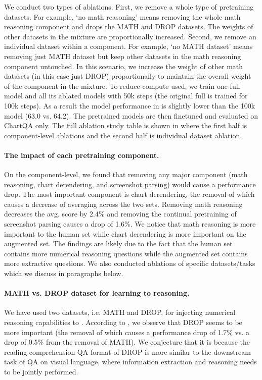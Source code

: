We conduct two types of ablations. First, we remove a whole type of pretraining datasets. For example, `no math reasoning' means removing the whole math reasoning component and drops the MATH and DROP datasets. The weights of other datasets in the mixture are proportionally increased. Second, we remove an individual dataset within a component. For example, `no MATH dataset' means removing just MATH dataset but keep other datasets in the math reasoning component untouched. In this scenario, we increase the weight of other math datasets (in this case just DROP) proportionally to maintain the overall weight of the component in the mixture. To reduce compute used, we train one full \model{} model and all its ablated models with 50k steps (the original full \model{} is trained for 100k steps). As a result the \model{} model performance in  is slightly lower than the 100k model (63.0 vs. 64.2). The pretrained models are then finetuned and evaluated on ChartQA only.
The full ablation study table is shown in  where the first half is component-level ablations and the second half is individual dataset ablation.

\paragraph{The impact of each pretraining component.} On the component-level, we found that removing any major component (math reasoning, chart derendering, and screenshot parsing) would cause a performance drop. The most important component is chart derendering, the removal of which causes a decrease of  averaging across the two sets. Removing math reasoning decreases the avg. score by 2.4\% and removing the continual pretraining of screenshot parsing causes a drop of 1.6\%. We notice that math reasoning is more important to the human set while chart derendering is more important on the augmented set. The findings are likely due to the fact that the human set contains more numerical reasoning questions while the augmented set contains more extractive questions. We also conducted ablations of specific datasets/tasks which we discuss in paragraphs below.



\paragraph{MATH vs. DROP dataset for learning to reasoning.} We have used two datasets, i.e. MATH and DROP, for injecting numerical reasoning capabilities to \model{}. According to , we observe that DROP seems to be more important (the removal of which causes a performance drop of 1.7\% vs. a drop of 0.5\% from the removal of MATH). We conjecture that it is because the reading-comprehension-QA format of DROP is more similar to the downstream task of QA on visual language, where information extraction and reasoning needs to be jointly performed.

